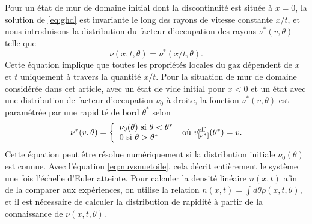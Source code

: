 \documentclass[submission, Phys]{SciPost}
\begin{document}
{Pour un état de mur de domaine initial dont la discontinuité est située à $x=0$, la solution de \eqref{eq:ghd} est invariante le long des rayons de vitesse constante $x/t$, et nous introduisons la distribution du facteur d'occupation des rayons $\nu^*(v,\theta)$ telle que
\begin{equation}
\label{eq:nuvsnuetoile}
    \nu(x,t,\theta)=\nu^*(x/t,\theta).
\end{equation}
Cette équation implique que toutes les propriétés locales du gaz dépendent de $x$ et $t$ uniquement à travers la quantité $x/t$. 
Pour la situation de mur de domaine considérée dans cet article, avec un état de vide initial pour $x<0$ et 
un état avec une distribution de facteur d'occupation $\nu_0$ à droite, 
la fonction $\nu^*(v,\theta)$ est paramétrée par une rapidité de bord $\theta^*$ selon
\begin{equation}
\label{eq:nuetoile}
    \nu^*(v,\theta)=\left \{ \begin{array}{l} 
    \nu_0(\theta) \mbox{ si } \theta < \theta^*\\
    0 \mbox{ si } \theta > \theta^*\\
    \end{array} \right . \mbox{ où }  v^{\rm{eff}}_{[\nu^*]}(\theta^*)=v.
\end{equation}
Cette équation peut être résolue numériquement si la distribution initiale $\nu_0(\theta)$ est connue. Avec l'équation \eqref{eq:nuvsnuetoile}, cela décrit entièrement le système une fois l'échelle d'Euler atteinte. Pour calculer la densité linéaire $n(x,t)$ afin de la comparer aux expériences, on utilise la relation $n(x,t)=\int d\theta \rho(x,t,\theta)$, et il est nécessaire de calculer la distribution de rapidité à partir de la connaissance de $\nu(x,t,\theta)$.

}
\end{document}
